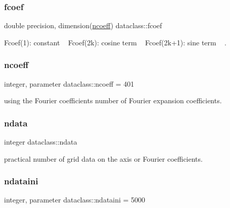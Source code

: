 \subsubsection{\texorpdfstring{fcoef}{fcoef}}
{\footnotesize\ttfamily double precision, dimension(\mbox{\hyperlink{namespacedataclass_aea44837b0eb59e9b5a864f3a59c7facc}{ncoeff}}) dataclass\+::fcoef}



Fcoef(1)\+: constant ~\newline
 Fcoef(2k)\+: cosine term ~\newline
 Fcoef(2k+1)\+: sine term ~\newline
. 

\mbox{\label{namespacedataclass_aea44837b0eb59e9b5a864f3a59c7facc}} 
\subsubsection{\texorpdfstring{ncoeff}{ncoeff}}
{\footnotesize\ttfamily integer, parameter dataclass\+::ncoeff = 401}



using the Fourier coefficients number of Fourier expansion coefficients. 

\mbox{\label{namespacedataclass_a72f075bdeedd35dc0962289e6f3461ba}} 
\subsubsection{\texorpdfstring{ndata}{ndata}}
{\footnotesize\ttfamily integer dataclass\+::ndata}



practical number of grid data on the axis or Fourier coefficients. 

\mbox{\label{namespacedataclass_a2578bbe9c4dc0892ee08a8619cd7e978}} 
\subsubsection{\texorpdfstring{ndataini}{ndataini}}
{\footnotesize\ttfamily integer, parameter dataclass\+::ndataini = 5000}



